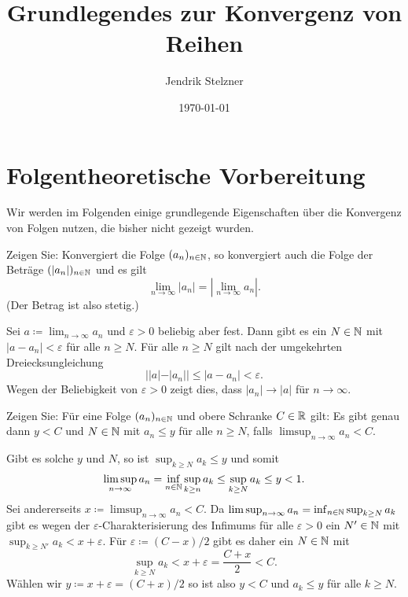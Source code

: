 \documentclass[a4paper,10pt]{article}
\title{Grundlegendes zur Konvergenz von Reihen}
\author{Jendrik Stelzner}
\date{\today}
\begin{document}
\maketitle

\tableofcontents





\section{Folgentheoretische Vorbereitung}


Wir werden im Folgenden einige grundlegende Eigenschaften über die Konvergenz von Folgen nutzen, die bisher nicht gezeigt wurden.


\begin{question}
 Zeigen Sie: Konvergiert die Folge $(a_n)_{n \in \mathbb{N}}$, so konvergiert auch die Folge der Beträge $(|a_n|)_{n \in \mathbb{N}}$ und es gilt
 \[
  \lim_{n \to \infty} |a_n| = \left| \lim_{n \to \infty} a_n \right|.
 \]
 (Der Betrag ist also stetig.)
\end{question}
\begin{solution}
 Sei $a \coloneqq \lim_{n \to \infty} a_n$ und $\varepsilon > 0$ beliebig aber fest. Dann gibt es ein $N \in \mathbb{N}$ mit $|a - a_n| < \varepsilon$ für alle $n \geq N$. Für alle $n \geq N$ gilt nach der umgekehrten Dreiecksungleichung
 \[
  ||a| - |a_n|| \leq |a - a_n| < \varepsilon.
 \]
 Wegen der Beliebigkeit von $\varepsilon > 0$ zeigt dies, dass $|a_n| \to |a|$ für $n \to \infty$.
\end{solution}


\begin{question}
 Zeigen Sie: Für eine Folge $(a_n)_{n \in \mathbb{N}}$ und obere Schranke $C \in \mathbb{R}$ gilt: Es gibt genau dann $y < C$ und $N \in \mathbb{N}$ mit $a_n \leq y$ für alle $n \geq N$, falls $\limsup_{n \to \infty} a_n < C$.
\end{question}
\begin{solution}
 Gibt es solche $y$ und $N$, so ist $\sup_{k \geq N} a_k \leq y$ und somit
 \[
  \limsup_{n \to \infty} a_n
  = \inf_{n \in \mathbb{N}} \sup_{k \geq n} a_k
  \leq \sup_{k \geq N} a_k
  \leq y
  < 1.
 \]
 Sei andererseits $x \coloneqq \limsup_{n \to \infty} a_n < C$. Da $\limsup_{n \to \infty} a_n = \inf_{n \in \mathbb{N}} \sup_{k \geq N} a_k$ gibt es wegen der $\varepsilon$-Charakterisierung des Infimums für alle $\varepsilon > 0$ ein $N' \in \mathbb{N}$ mit $\sup_{k \geq N'} a_k < x + \varepsilon$. Für $\varepsilon \coloneqq (C-x)/2$ gibt es daher ein $N \in \mathbb{N}$ mit
 \[
  \sup_{k \geq N} a_k < x + \varepsilon = \frac{C + x}{2} < C.
 \]
 Wählen wir $y \coloneqq x + \varepsilon = (C+x)/2$ so ist also $y < C$ und $a_k \leq y$ für alle $k \geq N$.
\end{solution}
\end{document}
